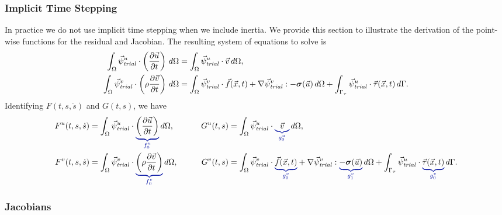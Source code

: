 \subsubsection{Implicit Time Stepping}
In practice we do not use implicit time stepping when we include
inertia. We provide this section to illustrate the derivation of the
point-wise functions for the residual and Jacobian. The resulting
system of equations to solve is
\begin{align}
  \label{eqn:elasticity:velocity:implicit}
  \int_\Omega \trialvec[u] \cdot \left( \frac{\partial \vec{u}}{\partial t} \right) \, d\Omega 
&= 
  \int_\Omega \trialvec[u] \cdot \vec{v} \, d\Omega, \\
%
  \label{eqn:elasticity:displacement:implicit}
  \int_\Omega \trialvec[v] \cdot \left( \rho \frac{\partial \vec{v}}{\partial t} \right) \, 
d\Omega &=
  \int_\Omega \trialvec[v] \cdot \vec{f}(\vec{x},t) + \nabla \trialvec[v] : -\tensor{\sigma}
(\vec{u}) \, d\Omega + 
\int_{\Gamma_\tau} \trialvec[u] \cdot \vec{\tau}(\vec{x},t) \, d\Gamma.
\end{align}
Identifying $F(t,s,\dot{s})$ and $G(t,s)$, we have
\begin{alignat}{2}
  F^u(t,s,\dot{s}) &= \int_\Omega \trialvec[u] \cdot \eqnannotate{\left( \frac{\partial 
\vec{u}}{\partial t} 
\right)}{f_0^u} \, d\Omega,
  & \qquad
  G^u(t,s) &= \int_\Omega \trialvec[u] \cdot \eqnannotate{\vec{v}}{g_0^u} \, d\Omega, \\
  F^v(t,s,\dot{s}) &= \int_\Omega \trialvec[v] \cdot \eqnannotate{\left( \rho \frac{\partial 
\vec{v}}{\partial t} 
\right)}{f_0^v} \, d\Omega,
  & \qquad
  G^v(t,s) &= \int_\Omega \trialvec[v] \cdot \eqnannotate{\vec{f}(\vec{x},t)}{g_0^v} + \nabla 
\trialvec[v] : 
\eqnannotate{-\tensor{\sigma}(\vec{u})}{g_1^v} \, d\Omega + \int_{\Gamma_\tau} \trialvec[u] 
\cdot 
\eqnannotate{\vec{\tau}(\vec{x},t)}{g_0^v} \, d\Gamma.
\end{alignat}


\subsubsection{Jacobians}

